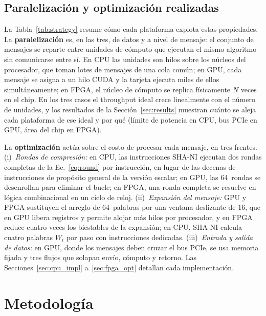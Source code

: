 \documentclass[conference]{IEEEtran}
\begin{document}
\subsection{Paralelización y optimización realizadas}

La Tabla~\ref{tab:strategy} resume cómo cada plataforma explota estas propiedades. La \textbf{paralelización} es, en las tres, de datos y a nivel de mensaje: el conjunto de mensajes se reparte entre unidades de cómputo que ejecutan el mismo algoritmo sin comunicarse entre sí. En CPU las unidades son hilos sobre los núcleos del procesador, que toman lotes de mensajes de una cola común; en GPU, cada mensaje se asigna a un hilo CUDA y la tarjeta ejecuta miles de ellos simultáneamente; en FPGA, el núcleo de cómputo se replica físicamente $N$ veces en el chip. En los tres casos el throughput ideal crece linealmente con el número de unidades, y los resultados de la Sección~\ref{sec:results} muestran cuánto se aleja cada plataforma de ese ideal y por qué (límite de potencia en CPU, bus PCIe en GPU, área del chip en FPGA).

La \textbf{optimización} actúa sobre el costo de procesar cada mensaje, en tres frentes. (i)~\textit{Rondas de compresión:} en CPU, las instrucciones SHA-NI ejecutan dos rondas completas de la Ec.~\ref{eq:round} por instrucción, en lugar de las decenas de instrucciones de propósito general de la versión escalar; en GPU, las 64~rondas se desenrollan para eliminar el bucle; en FPGA, una ronda completa se resuelve en lógica combinacional en un ciclo de reloj. (ii)~\textit{Expansión del mensaje:} GPU y FPGA sustituyen el arreglo de 64~palabras por una ventana deslizante de 16, que en GPU libera registros y permite alojar más hilos por procesador, y en FPGA reduce cuatro veces los biestables de la expansión; en CPU, SHA-NI calcula cuatro palabras $W_t$ por paso con instrucciones dedicadas. (iii)~\textit{Entrada y salida de datos:} en GPU, donde los mensajes deben cruzar el bus PCIe, se usa memoria fijada y tres flujos que solapan envío, cómputo y retorno. Las Secciones~\ref{sec:cpu_impl} a~\ref{sec:fpga_opt} detallan cada implementación.



\section{Metodología}
\end{document}
